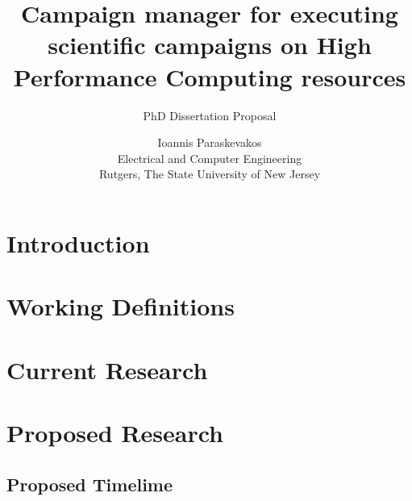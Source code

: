 

\title{Campaign manager for executing scientific campaigns on High Performance Computing resources}
\subtitle{PhD Dissertation Proposal}
\author{Ioannis Paraskevakos \\	Electrical and Computer Engineering \\
        Rutgers, The State University of New Jersey}
\date{}

\maketitle


\section{Introduction}


\section{Working Definitions}


\section{Current Research}


\section{Proposed Research}


\subsection{Proposed Timelime}




